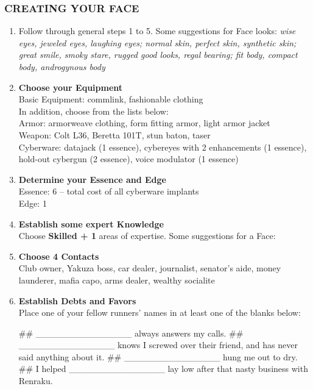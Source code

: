 \subsubsection{CREATING YOUR FACE}
\begin{enumerate}
    \item Follow through general steps 1 to 5. Some suggestions for Face looks: \textit{wise eyes, jeweled eyes, laughing eyes; normal skin, perfect skin, synthetic skin; great smile, smoky stare, rugged good looks, regal bearing; fit body, compact body, androgynous body}
    
    \item \textbf{Choose your Equipment} \\
    Basic Equipment: commlink, fashionable clothing \\
    In addition, choose from the lists below: \\
    Armor: armorweave clothing, form fitting armor, light armor jacket \\
    Weapon: Colt L36, Beretta 101T, stun baton, taser \\
    Cyberware: datajack (1 essence), cybereyes with 2 enhancements (1 essence), hold-out cybergun (2 essence), voice modulator (1 essence)
    
    \item \textbf{Determine your Essence and Edge} \\
    Essence: 6 – total cost of all cyberware implants \\
    Edge: 1

    \item \textbf{Establish some expert Knowledge} \\
    Choose \textbf{\textsf{Skilled + 1}} areas of expertise. Some suggestions for a Face: \textit{}
    
    \item \textbf{Choose 4 Contacts} \\
    Club owner, Yakuza boss, car dealer, journalist, senator’s aide, money launderer, mafia capo, arms dealer, wealthy socialite
    
    \item \textbf{Establish Debts and Favors} \\
    Place one of your fellow runners’ names in at least one of the blanks below:
        \begin{easylist}
            ## \_\_\_\_\_\_\_\_\_\_\_\_\_\_\_ always answers my calls.
            ## \_\_\_\_\_\_\_\_\_\_\_\_\_\_\_ knows I screwed over their friend, and has never said anything about it.
            ## \_\_\_\_\_\_\_\_\_\_\_\_\_\_\_ hung me out to dry.
            ## I helped \_\_\_\_\_\_\_\_\_\_\_\_\_\_\_ lay low after that nasty business with Renraku.
        \end{easylist}
    

\end{enumerate}
